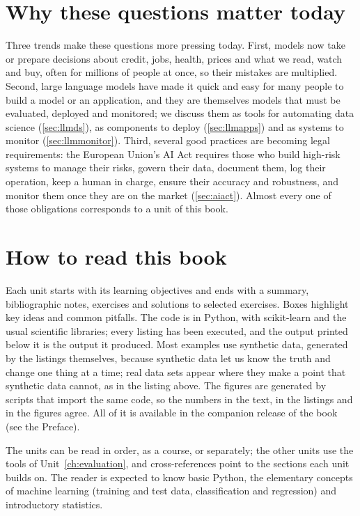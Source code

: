 \section*{Why these questions matter today}

Three trends make these questions more pressing today. First, models now take or prepare decisions about
credit, jobs, health, prices and what we read, watch and buy, often for millions of people at once, so their
mistakes are multiplied. Second, large language models have made it quick and easy for many people to build a
model or an application, and they are themselves models that must be evaluated, deployed and
monitored; we discuss them as tools for automating data science (\cref{sec:llmds}), as components to deploy
(\cref{sec:llmapps}) and as systems to monitor (\cref{sec:llmmonitor}). Third, several good practices are
becoming legal requirements: the European Union's AI Act requires those who build high-risk systems to manage their risks,
govern their data, document them, log their operation, keep a human in charge, ensure their accuracy and
robustness, and monitor them once they are on the market (\cref{sec:aiact}). Almost every one of those
obligations corresponds to a unit of this book.

\section*{How to read this book}

Each unit starts with its learning objectives and ends with a summary, bibliographic notes, exercises and
solutions to selected exercises. Boxes highlight key ideas and common pitfalls. The code is in Python, with
scikit-learn and the usual scientific libraries; every listing has been executed, and the output printed below
it is the output it produced. Most examples use synthetic data, generated by the listings themselves, because
synthetic data let us know the truth and change one thing at a time; real data sets appear where they make a
point that synthetic data cannot, as in the listing above. The figures are generated by scripts that import the
same code, so the numbers in the text, in the listings and in the figures agree. All of it is available in the
companion release of the book (see the Preface).

The units can be read in order, as a course, or separately; the other units use the tools of Unit~\ref{ch:evaluation}, and cross-references point to the sections each unit builds on. The reader is expected to know basic
Python, the elementary concepts of machine learning (training and test data, classification and regression)
and introductory statistics.

